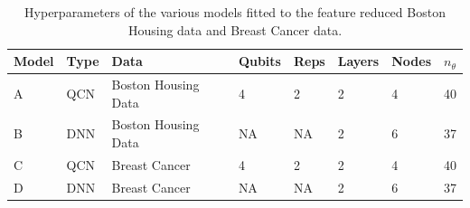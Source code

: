 \begin{table}[H]
\centering
\caption{Hyperparameters of the various models fitted to the feature reduced Boston Housing data and Breast Cancer data.} 
\begin{tabular}{|l|l|l|l|l|l|l|l|}
\hline
Model& Type& Data& Qubits& Reps& Layers & Nodes &$n_{\theta}$ \\ \hline
A    & QCN & Boston Housing Data  & 4     & 2  &2     & 4& 40   \\ \hline
B    & DNN & Boston Housing Data  & NA    & NA &2     & 6& 37 \\ \Xhline{2\arrayrulewidth}
C    & QCN & Breast Cancer        & 4     & 2  &2     & 4& 40  \\ \hline
D    & DNN & Breast Cancer        & NA    & NA &2     & 6& 37  \\ \hline
\end{tabular}

\label{tab:training models PCA}
\end{table}


%        


